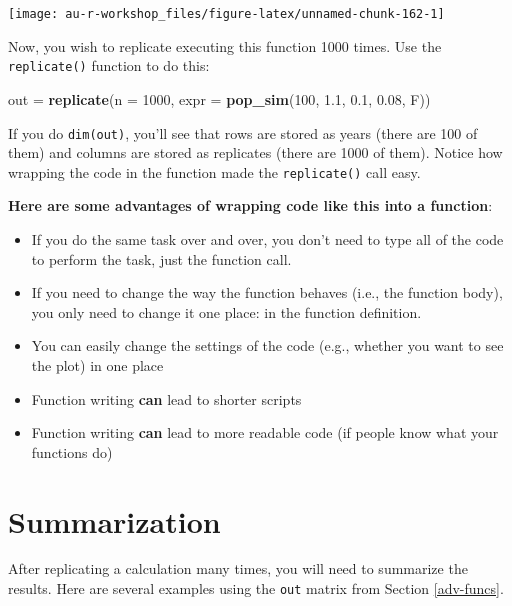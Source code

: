 \documentclass[]{book}
\newenvironment{Shaded}{\begin{snugshade}}{\end{snugshade}}
\newcommand{\KeywordTok}[1]{\textcolor[rgb]{0.13,0.29,0.53}{\textbf{#1}}}
\newcommand{\DataTypeTok}[1]{\textcolor[rgb]{0.13,0.29,0.53}{#1}}
\newcommand{\DecValTok}[1]{\textcolor[rgb]{0.00,0.00,0.81}{#1}}
\newcommand{\FloatTok}[1]{\textcolor[rgb]{0.00,0.00,0.81}{#1}}
\newcommand{\StringTok}[1]{\textcolor[rgb]{0.31,0.60,0.02}{#1}}
\newcommand{\NormalTok}[1]{#1}
\providecommand{\tightlist}{%
  \setlength{\itemsep}{0pt}\setlength{\parskip}{0pt}}
\theoremstyle{definition}
\theoremstyle{definition}
\theoremstyle{definition}
\theoremstyle{remark}
\begin{document}
\begin{center}\texttt{[image: au-r-workshop\_files/figure-latex/unnamed-chunk-162-1]} \end{center}

Now, you wish to replicate executing this function 1000 times. Use the
\texttt{replicate()} function to do this:

\begin{Shaded}
\begin{Highlighting}[]
\NormalTok{out =}\StringTok{ }\KeywordTok{replicate}\NormalTok{(}\DataTypeTok{n =} \DecValTok{1000}\NormalTok{, }\DataTypeTok{expr =} \KeywordTok{pop_sim}\NormalTok{(}\DecValTok{100}\NormalTok{, }\FloatTok{1.1}\NormalTok{, }\FloatTok{0.1}\NormalTok{, }\FloatTok{0.08}\NormalTok{, F))}
\end{Highlighting}
\end{Shaded}

If you do \texttt{dim(out)}, you'll see that rows are stored as years
(there are 100 of them) and columns are stored as replicates (there are
1000 of them). Notice how wrapping the code in the function made the
\texttt{replicate()} call easy.

\textbf{Here are some advantages of wrapping code like this into a
function}:

\begin{itemize}
\tightlist
\item
  If you do the same task over and over, you don't need to type all of
  the code to perform the task, just the function call.
\item
  If you need to change the way the function behaves (i.e., the function
  body), you only need to change it one place: in the function
  definition.
\item
  You can easily change the settings of the code (e.g., whether you want
  to see the plot) in one place
\item
  Function writing \textbf{can} lead to shorter scripts
\item
  Function writing \textbf{can} lead to more readable code (if people
  know what your functions do)
\end{itemize}

\section{Summarization}\label{mc-summaries}

After replicating a calculation many times, you will need to summarize
the results. Here are several examples using the \texttt{out} matrix
from Section \ref{adv-funcs}.
\end{document}
